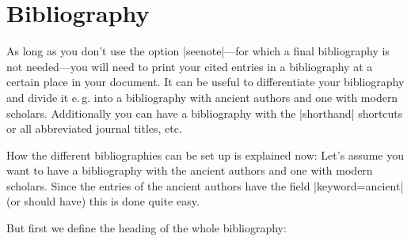\documentclass[a4paper,
10pt,
greek,
french,
spanish,
italian,
ngerman,
english,
]{ltxdoc}
\begin{document}
  


 \section{Bibliography}\label{bibliographie}
 \DescribeMacro{\printbibliography}
As long as you don’t use the option |seenote|---for 
which a final bibliography is not needed---you will need to print your cited entries in a bibliography 
at a certain place in your document.
It can be useful to differentiate your bibliography and divide it e.\,g. into a bibliography 
with ancient authors and one with modern scholars.
Additionally you can have a bibliography with the |shorthand| shortcuts or all abbreviated journal titles, etc.

How the different bibliographies can be set up is explained now:
Let’s assume you want to have a bibliography with the ancient authors and one with modern scholars.
Since the entries of the ancient authors have the field |keyword={ancient}| (or should have) this is done quite easy.

But first we define the heading of the whole  bibliography:
\end{document}
